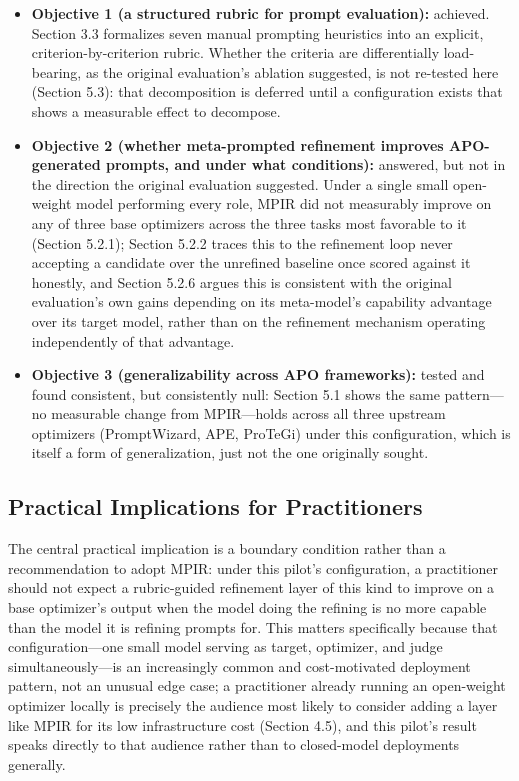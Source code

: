 \documentclass[a4paper,fleqn]{cas-sc}
\begin{document}
\begin{itemize}
\item \textbf{Objective 1 (a structured rubric for prompt evaluation):} achieved. Section 3.3 formalizes seven manual prompting heuristics into an explicit, criterion-by-criterion rubric. Whether the criteria are differentially load-bearing, as the original evaluation's ablation suggested, is not re-tested here (Section 5.3): that decomposition is deferred until a configuration exists that shows a measurable effect to decompose.
\item \textbf{Objective 2 (whether meta-prompted refinement improves APO-generated prompts, and under what conditions):} answered, but not in the direction the original evaluation suggested. Under a single small open-weight model performing every role, MPIR did not measurably improve on any of three base optimizers across the three tasks most favorable to it (Section 5.2.1); Section 5.2.2 traces this to the refinement loop never accepting a candidate over the unrefined baseline once scored against it honestly, and Section 5.2.6 argues this is consistent with the original evaluation's own gains depending on its meta-model's capability advantage over its target model, rather than on the refinement mechanism operating independently of that advantage.
\item \textbf{Objective 3 (generalizability across APO frameworks):} tested and found consistent, but consistently null: Section 5.1 shows the same pattern---no measurable change from MPIR---holds across all three upstream optimizers (PromptWizard, APE, ProTeGi) under this configuration, which is itself a form of generalization, just not the one originally sought.
\end{itemize}

\subsection{Practical Implications for Practitioners}

The central practical implication is a boundary condition rather than a recommendation to adopt MPIR: under this pilot's configuration, a practitioner should not expect a rubric-guided refinement layer of this kind to improve on a base optimizer's output when the model doing the refining is no more capable than the model it is refining prompts for. This matters specifically because that configuration---one small model serving as target, optimizer, and judge simultaneously---is an increasingly common and cost-motivated deployment pattern, not an unusual edge case; a practitioner already running an open-weight optimizer locally is precisely the audience most likely to consider adding a layer like MPIR for its low infrastructure cost (Section 4.5), and this pilot's result speaks directly to that audience rather than to closed-model deployments generally.
\end{document}
